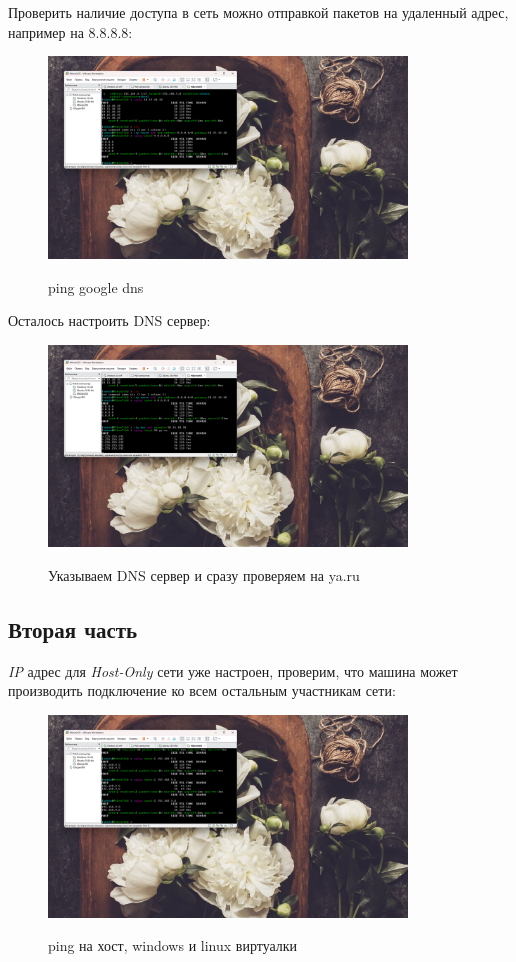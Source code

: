 \documentclass[a4paper]{article}
\begin{document}
  Проверить наличие доступа в сеть можно отправкой пакетов на удаленный адрес, например на 8.8.8.8:
  
  \begin{figure}[H]
    \centering
    \includegraphics[width=0.85\textwidth]{06_00 (94)}
    \label{img:94}
    \caption{ping google dns}
  \end{figure}
  
  Осталось настроить DNS сервер:

  \begin{figure}[H]
    \centering
    \includegraphics[width=0.85\textwidth]{06_00 (95)}
    \label{img:95}
    \caption{Указываем DNS сервер и сразу проверяем на ya.ru}
  \end{figure}

  \subsection{Вторая часть}

  \textit{IP} адрес для \textit{Host-Only} сети уже настроен, проверим, что машина может
  производить подключение ко всем остальным участникам сети:
  
  \begin{figure}[H]
    \centering
    \includegraphics[width=0.85\textwidth]{06_00 (96)}
    \label{img:96}
    \caption{ping на хост, windows и linux виртуалки}
  \end{figure}
  
\end{document}
